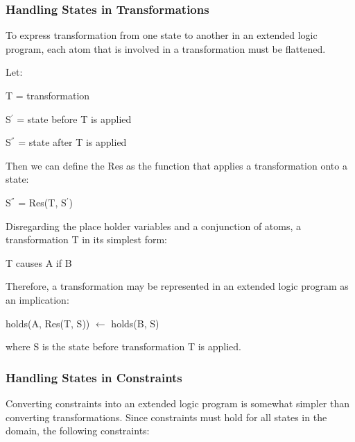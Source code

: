 \documentclass[a4paper]{article}
\begin{document}
      \subsubsection{Handling States in Transformations}

        To express transformation from one state to another in an extended
        logic program, each atom that is involved in a transformation must
        be flattened.

        Let:
  
        \begin{list}{}{}
          \item T = transformation
          \item S$^{'}$ = state before T is applied
          \item S$^{''}$ = state after T is applied
        \end{list}
  
        Then we can define the Res as the function that applies a 
        transformation onto a state:
  
        \begin{list}{}{}
          \item S$^{''}$ = Res(T, S$^{'}$)
        \end{list}
  
        Disregarding the place holder variables and a conjunction of atoms, 
        a transformation T in its simplest form:
  
        \begin{list}{}{}
          \item T causes A if B
        \end{list}
  
        Therefore, a transformation may be represented in an extended logic
        program as an implication:
 
        \begin{list}{}{}
          \item holds(A, Res(T, S)) $\leftarrow$ holds(B, S)
        \end{list}

        where S is the state before transformation T is applied.

      \subsubsection{Handling States in Constraints}

        Converting constraints into an extended logic program is somewhat
        simpler than converting transformations. Since constraints must hold
        for all states in the domain, the following constraints:
\end{document}
